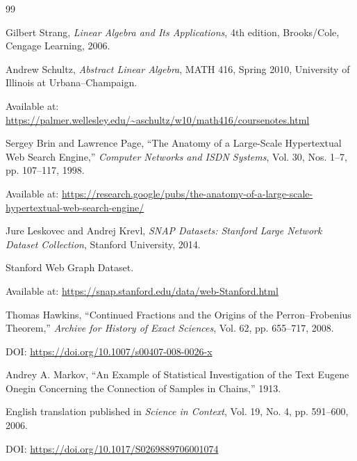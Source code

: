 \documentclass[11pt,a4paper]{article}
\theoremstyle{definition}
\theoremstyle{remark}
\begin{document}

\begin{thebibliography}{99}

Gilbert Strang,
\textit{Linear Algebra and Its Applications},
4th edition,
Brooks/Cole, Cengage Learning, 2006.

Andrew Schultz,
\textit{Abstract Linear Algebra},
MATH 416, Spring 2010,
University of Illinois at Urbana--Champaign.



Available at:
\url{https://palmer.wellesley.edu/~aschultz/w10/math416/coursenotes.html}

Sergey Brin and Lawrence Page,
``The Anatomy of a Large-Scale Hypertextual
Web Search Engine,''
\textit{Computer Networks and ISDN Systems},
Vol. 30, Nos. 1--7,
pp. 107--117, 1998.

Available at:
\url{https://research.google/pubs/the-anatomy-of-a-large-scale-hypertextual-web-search-engine/}

Jure Leskovec and Andrej Krevl,
\textit{SNAP Datasets: Stanford Large
Network Dataset Collection},
Stanford University, 2014.

Stanford Web Graph Dataset.

Available at:
\url{https://snap.stanford.edu/data/web-Stanford.html}

Thomas Hawkins,
``Continued Fractions and the Origins
of the Perron--Frobenius Theorem,''
\textit{Archive for History of Exact Sciences},
Vol. 62,
pp. 655--717, 2008.

DOI:
\url{https://doi.org/10.1007/s00407-008-0026-x}

Andrey A. Markov,
``An Example of Statistical Investigation
of the Text Eugene Onegin Concerning
the Connection of Samples in Chains,''
1913.

English translation published in
\textit{Science in Context},
Vol. 19, No. 4,
pp. 591--600, 2006.

DOI:
\url{https://doi.org/10.1017/S0269889706001074}

\end{thebibliography}
\end{document}
